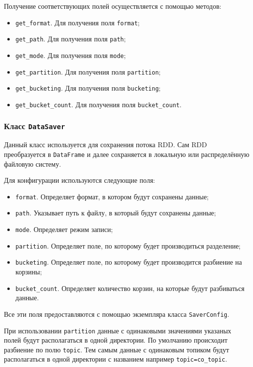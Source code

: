 Получение соответствующих полей осуществляется с помощью методов:
\begin{itemize}
    \item \texttt{get\_format}. Для получения поля \texttt{format};
    \item \texttt{get\_path}. Для получения поля \texttt{path};
    \item \texttt{get\_mode}. Для получения поля \texttt{mode};
    \item \texttt{get\_partition}. Для получения поля \texttt{partition};
    \item \texttt{get\_bucketing}. Для получения поля \texttt{bucketing};
    \item \texttt{get\_bucket\_count}. Для получения поля \texttt{bucket\_count}.
\end{itemize}

\subsubsection{Класс \texttt{DataSaver}}
Данный класс используется для сохранения потока RDD.
Сам RDD преобразуется в \texttt{DataFrame} и далее сохраняется в локальную или распределённую файловую систему.

Для конфигурации используются следующие поля:
\begin{itemize}
    \item \texttt{format}. Определяет формат, в котором будут сохранены данные;
    \item \texttt{path}. Указывает путь к файлу, в который будут сохранены данные;
    \item \texttt{mode}. Определяет режим записи;
    \item \texttt{partition}. Определяет поле, по которому будет производиться разделение;
    \item \texttt{bucketing}. Определяет поле, по которому будет производится разбиение на корзины;
    \item \texttt{bucket\_count}. Определяет количество корзин, на которые будут разбиваться данные.
\end{itemize}

Все эти поля предоставляются с помощью экземпляра класса \texttt{SaverConfig}.

При использовании \texttt{partition} данные с одинаковыми значениями указаных полей будут располагаться в одной директории.
По умолчанию происходит разбиение по полю \texttt{topic}.
Тем самым данные с одинаковым топиком будут располагаться в одной директории с названием например \texttt{topic=co_topic}.

